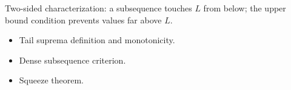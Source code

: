 \begin{remark*}
Two-sided characterization: a subsequence touches $L$ from below; the upper bound condition prevents values far above $L$.
\end{remark*}

\begin{remark*}[Dependencies]
\begin{itemize}
  \item Tail suprema definition and monotonicity.
  \item Dense subsequence criterion.
  \item Squeeze theorem.
\end{itemize}
\end{remark*}
